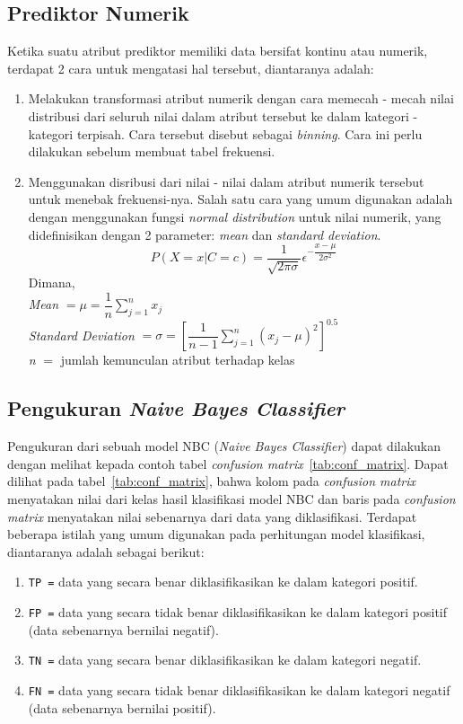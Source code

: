 \subsection{Prediktor Numerik}
\cite{garg2013design} 
Ketika suatu atribut prediktor memiliki data bersifat kontinu atau numerik, terdapat 2 cara untuk mengatasi hal tersebut, diantaranya adalah:
\begin{enumerate}
	\item Melakukan transformasi atribut numerik dengan cara memecah - mecah nilai distribusi dari seluruh nilai dalam atribut tersebut ke dalam kategori - kategori terpisah. Cara tersebut disebut sebagai \textit{binning}. Cara ini perlu dilakukan sebelum membuat tabel frekuensi.
	
	\item Menggunakan disribusi dari nilai - nilai dalam atribut numerik tersebut untuk menebak frekuensi-nya. Salah satu cara yang umum digunakan adalah dengan menggunakan fungsi \textit{normal distribution} untuk nilai numerik, yang didefinisikan dengan 2 parameter: \textit{mean} dan \textit{standard deviation}.
	\begin{equation}
	P(X=x|C=c) = \dfrac{1}{\sqrt{2\pi\sigma}}\epsilon^{-\dfrac{x-\mu}{2\sigma^2}}
	\end{equation}
	Dimana,\\
	\textit{Mean} $= \mu = \dfrac{1}{n}\sum^n_{j=1}x_j$\\
	\textit{Standard Deviation} $= \sigma = [\dfrac{1}{n-1}\sum^n_{j=1}(x_j-\mu)^2]^{0.5}$\\
	\textit{n} $=$ jumlah kemunculan atribut terhadap kelas
	
	
\end{enumerate}

\subsection{Pengukuran \textit{Naive Bayes Classifier}}

Pengukuran dari sebuah model NBC (\textit{Naive Bayes Classifier}) dapat dilakukan dengan melihat kepada contoh tabel \textit{confusion matrix}~\ref{tab:conf_matrix}. Dapat dilihat pada tabel~\ref{tab:conf_matrix}, bahwa kolom pada \textit{confusion matrix} menyatakan nilai dari kelas hasil klasifikasi model NBC dan baris pada \textit{confusion matrix} menyatakan nilai sebenarnya dari data yang diklasifikasi. Terdapat beberapa istilah yang umum digunakan pada perhitungan model klasifikasi, diantaranya adalah sebagai berikut:
\begin{enumerate}
	\item \texttt{TP =} data yang secara benar diklasifikasikan ke dalam kategori positif.
	\item \texttt{FP =} data yang secara tidak benar diklasifikasikan ke dalam kategori positif (data sebenarnya bernilai negatif).
	\item \texttt{TN =} data yang secara benar diklasifikasikan ke dalam kategori negatif.
	\item \texttt{FN =} data yang secara tidak benar diklasifikasikan ke dalam kategori negatif (data sebenarnya bernilai positif).
\end{enumerate}

